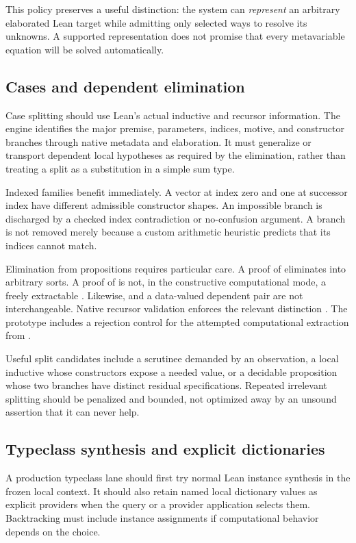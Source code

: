 This policy preserves a useful distinction: the system can \emph{represent} an arbitrary elaborated Lean target while admitting only selected ways to resolve its unknowns. A supported representation does not promise that every metavariable equation will be solved automatically.

\subsection{Cases and dependent elimination}

Case splitting should use Lean's actual inductive and recursor information. The engine identifies the major premise, parameters, indices, motive, and constructor branches through native metadata and elaboration. It must generalize or transport dependent local hypotheses as required by the elimination, rather than treating a split as a substitution in a simple sum type.

Indexed families benefit immediately. A vector at index zero and one at successor index have different admissible constructor shapes. An impossible branch is discharged by a checked index contradiction or no-confusion argument. A branch is not removed merely because a custom arithmetic heuristic predicts that its indices cannot match.

Elimination from propositions requires particular care. A proof of  eliminates into arbitrary sorts. A proof of  is not, in the constructive computational mode, a freely extractable . Likewise,  and a data-valued dependent pair are not interchangeable. Native recursor validation enforces the relevant distinction \cite{lean-inductives}. The prototype includes a rejection control for the attempted computational extraction from .

Useful split candidates include a scrutinee demanded by an observation, a local inductive whose constructors expose a needed value, or a decidable proposition whose two branches have distinct residual specifications. Repeated irrelevant splitting should be penalized and bounded, not optimized away by an unsound assertion that it can never help.

\subsection{Typeclass synthesis and explicit dictionaries}

A production typeclass lane should first try normal Lean instance synthesis in the frozen local context. It should also retain named local dictionary values as explicit providers when the query or a provider application selects them. Backtracking must include instance assignments if computational behavior depends on the choice.

